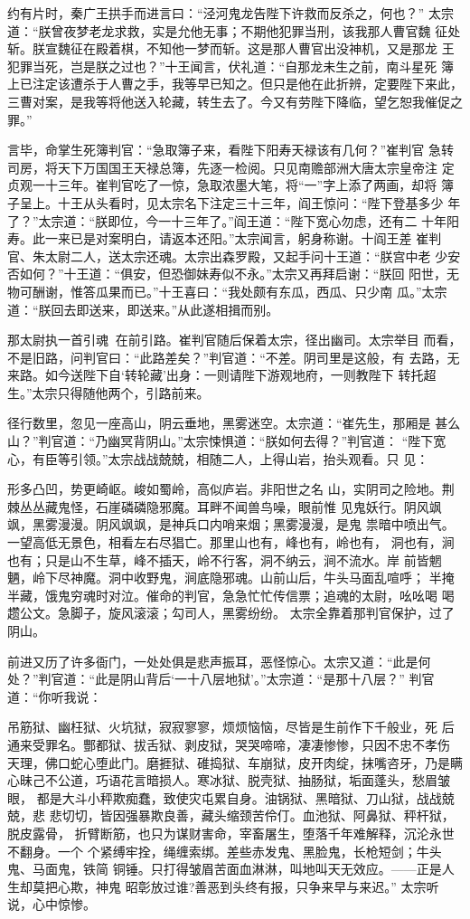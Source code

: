 约有片时，秦广王拱手而进言曰：“泾河鬼龙告陛下许救而反杀之，何也？”
太宗道：“朕曾夜梦老龙求救，实是允他无事；不期他犯罪当刑，该我那人曹官魏
征处斩。朕宣魏征在殿着棋，不知他一梦而斩。这是那人曹官出没神机，又是那龙
王犯罪当死，岂是朕之过也？”十王闻言，伏礼道：“自那龙未生之前，南斗星死
簿上已注定该遭杀于人曹之手，我等早已知之。但只是他在此折辨，定要陛下来此，
三曹对案，是我等将他送入轮藏，转生去了。今又有劳陛下降临，望乞恕我催促之
罪。”

言毕，命掌生死簿判官：“急取簿子来，看陛下阳寿天禄该有几何？”崔判官
急转司房，将天下万国国王天禄总簿，先逐一检阅。只见南赡部洲大唐太宗皇帝注
定贞观一十三年。崔判官吃了一惊，急取浓墨大笔，将“一”字上添了两画，却将
簿子呈上。十王从头看时，见太宗名下注定三十三年，阎王惊问：“陛下登基多少
年了？”太宗道：“朕即位，今一十三年了。”阎王道：“陛下宽心勿虑，还有二
十年阳寿。此一来已是对案明白，请返本还阳。”太宗闻言，躬身称谢。十阎王差
崔判官、朱太尉二人，送太宗还魂。太宗出森罗殿，又起手问十王道：“朕宫中老
少安否如何？”十王道：“俱安，但恐御妹寿似不永。”太宗又再拜启谢：“朕回
阳世，无物可酬谢，惟答瓜果而已。”十王喜曰：“我处颇有东瓜，西瓜、只少南
瓜。”太宗道：“朕回去即送来，即送来。”从此遂相揖而别。

那太尉执一首引魂，在前引路。崔判官随后保着太宗，径出幽司。太宗举目
而看，不是旧路，问判官曰：“此路差矣？”判官道：“不差。阴司里是这般，有
去路，无来路。如今送陛下自‘转轮藏’出身：一则请陛下游观地府，一则教陛下
转托超生。”太宗只得随他两个，引路前来。

径行数里，忽见一座高山，阴云垂地，黑雾迷空。太宗道：“崔先生，那厢是
甚么山？”判官道：“乃幽冥背阴山。”太宗悚惧道：“朕如何去得？”判官道：
“陛下宽心，有臣等引领。”太宗战战兢兢，相随二人，上得山岩，抬头观看。只
见：

形多凸凹，势更崎岖。峻如蜀岭，高似庐岩。非阳世之名
山，实阴司之险地。荆棘丛丛藏鬼怪，石崖磷磷隐邪魔。耳畔不闻兽鸟噪，眼前惟
见鬼妖行。阴风飒飒，黑雾漫漫。阴风飒飒，是神兵口内哨来烟；黑雾漫漫，是鬼
祟暗中喷出气。一望高低无景色，相看左右尽猖亡。那里山也有，峰也有，岭也有，
洞也有，涧也有；只是山不生草，峰不插天，岭不行客，洞不纳云，涧不流水。岸
前皆魍魉，岭下尽神魔。洞中收野鬼，涧底隐邪魂。山前山后，牛头马面乱喧呼；
半掩半藏，饿鬼穷魂时对泣。催命的判官，急急忙忙传信票；追魂的太尉，吆吆喝
喝趱公文。急脚子，旋风滚滚；勾司人，黑雾纷纷。
太宗全靠着那判官保护，过了阴山。

前进又历了许多衙门，一处处俱是悲声振耳，恶怪惊心。太宗又道：“此是何
处？”判官道：“此是阴山背后‘一十八层地狱’。”太宗道：“是那十八层？”
判官道：“你听我说：

吊筋狱、幽枉狱、火坑狱，寂寂寥寥，烦烦恼恼，尽皆是生前作下千般业，死
后通来受罪名。酆都狱、拔舌狱、剥皮狱，哭哭啼啼，凄凄惨惨，只因不忠不孝伤
天理，佛口蛇心堕此门。磨捱狱、碓捣狱、车崩狱，皮开肉绽，抹嘴咨牙，乃是瞒
心昧己不公道，巧语花言暗损人。寒冰狱、脱壳狱、抽肠狱，垢面蓬头，愁眉皱眼，
都是大斗小秤欺痴蠢，致使灾屯累自身。油锅狱、黑暗狱、刀山狱，战战兢兢，悲
悲切切，皆因强暴欺良善，藏头缩颈苦伶仃。血池狱、阿鼻狱、秤杆狱，脱皮露骨，
折臂断筋，也只为谋财害命，宰畜屠生，堕落千年难解释，沉沦永世不翻身。一个
个紧缚牢拴，绳缠索绑。差些赤发鬼、黑脸鬼，长枪短剑；牛头鬼、马面鬼，铁简
铜锤。只打得皱眉苦面血淋淋，叫地叫天无效应。——正是人生却莫把心欺，神鬼
昭彰放过谁?善恶到头终有报，只争来早与来迟。”
太宗听说，心中惊惨。

